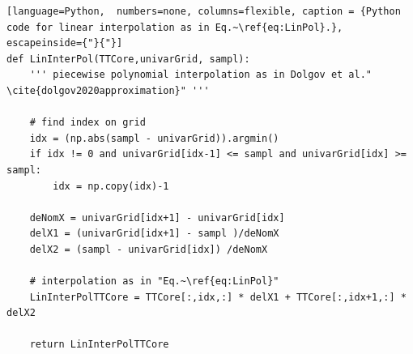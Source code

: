 \clearpage
\begin{lstlisting}[language=Python,	 numbers=none, columns=flexible, caption = {Python code for linear interpolation as in Eq.~\ref{eq:LinPol}.}, escapeinside={"}{"}]
def LinInterPol(TTCore,univarGrid, sampl):
	''' piecewise polynomial interpolation as in Dolgov et al." \cite{dolgov2020approximation}" '''
	
	# find index on grid
	idx = (np.abs(sampl - univarGrid)).argmin()
	if idx != 0 and univarGrid[idx-1] <= sampl and univarGrid[idx] >= sampl:
		idx = np.copy(idx)-1
	
	deNomX = univarGrid[idx+1] - univarGrid[idx]
	delX1 = (univarGrid[idx+1] - sampl )/deNomX
	delX2 = (sampl - univarGrid[idx]) /deNomX
	
	# interpolation as in "Eq.~\ref{eq:LinPol}"
	LinInterPolTTCore = TTCore[:,idx,:] * delX1 + TTCore[:,idx+1,:] * delX2
	
	return LinInterPolTTCore
\end{lstlisting}
\clearpage


